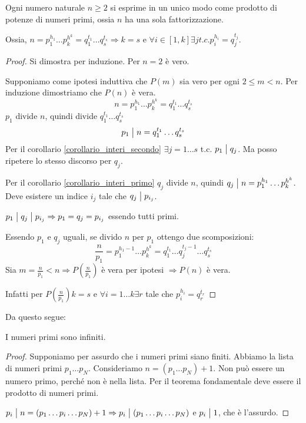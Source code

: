 \begin{theorem}
Ogni numero naturale $n \ge 2$ si esprime in un unico modo come prodotto di potenze di numeri primi, ossia $n$ ha una sola fattorizzazione.

Ossia, $n = p_{1}^{h_1} \dots p_{k}^{h^k} = q_{1}^{t_1} \dots q_{s}^{t_s} \Rightarrow k = s$ e $\forall i \in [1, k] \exists j t.c. p_i^{h_i} = q_j^{t_j}$.
\end{theorem}
\begin{proof}
Si dimostra per induzione. Per $n = 2$ \`e vero.

Supponiamo come ipotesi induttiva che $P(m)$ sia vero per ogni $2 \le m < n$. Per induzione dimostriamo che $P(n)$ \`e vera.
\[
n = p_{1}^{h_1} \dots p_{k}^{h^k} = q_{1}^{t_1} \dots q_{s}^{t_s}
\]
$p_1$ divide $n$, quindi divide $q_{1}^{t_1} \dots q_{s}^{t_s}$
\[
p_1 \bigm| n = q_{1}^{t_1} \dots q_{s}^{t_s}
\]
Per il corollario \ref{corollario_interi_secondo} $\exists j = 1 \dots s$ t.c. $p_1 \bigm| q_j$. Ma posso ripetere lo stesso discorso per $q_j$.

Per il corollario \ref{corollario_interi_primo} $q_j$ divide $n$, quindi $q_j \bigm| n = p_{1}^{h_1} \dots p_{k}^{h^k}$. Deve esistere un indice $i_j$ tale che $q_j \bigm| p_{i_j}$.

$p_1 \bigm| q_j \bigm| p_{i_j} \Rightarrow p_1 = q_j = p_{i_j} $ essendo tutti primi.

Essendo $p_1$ e $q_j$ uguali, se divido $n$ per $p_1$ ottengo due scomposizioni:
\[
\frac{n}{p_1} = p_{1}^{h_1 - 1} \dots p_{k}^{h^k} = q_{1}^{t_1} \dots q_{j}^{t_j - 1}\dots q_{s}^{t_s}
\]
Sia $m = \frac{n}{p_1} < n \Rightarrow P(\frac{n}{p_1})$ \`e vera per ipotesi $\Rightarrow P(n)$ \`e vera.

Infatti per $P( \frac{n}{p_1}) k = s$ e $\forall i = 1 \dots k \exists r$ tale che $p_i^{h_i} = q_r^{t_r}$
\end{proof}

Da questo segue:
\begin{theorem}
I numeri primi sono infiniti.
\end{theorem}
\begin{proof}
Supponiamo per assurdo che i numeri primi siano finiti. Abbiamo la lista di numeri primi $p_1 \dots p_N$. Consideriamo $n = (p_1 \dots p_N) + 1$. Non pu\`o essere un numero primo, perch\'e non \`e nella lista. Per il teorema fondamentale deve essere il prodotto di numeri primi.

$p_i \bigm| n = (p_1 \dots p_i \dots p_N) + 1 \Rightarrow p_i \bigm| (p_1 \dots p_i \dots p_N)$ e $p_i \bigm| 1$, che \`e l'assurdo.
\end{proof}

